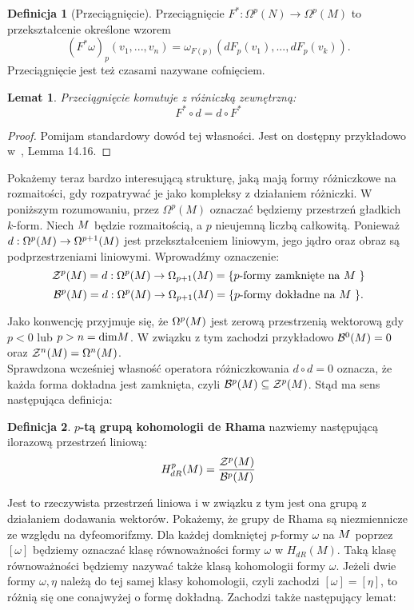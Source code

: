 \documentclass[licencjacka]{pracamgr}
\theoremstyle{definition}
\newtheorem{definition}{Definicja}[section]
\theoremstyle{definition}
\theoremstyle{plain}
\newtheorem{lemma}{Lemat}[section]
\theoremstyle{plain}
\theoremstyle{plain}
\theoremstyle{plain}
\def\M{\ensuremath M}
\begin{document}
\begin{definition}[Przeciągnięcie]
Przeciągnięcie $F^\ast: \Omega^p(N) \rightarrow \Omega^p(M)$ to przekształcenie
określone wzorem
\[
    (F^\ast \omega)_p(v_1, ..., v_n) =
        \omega_{F(p)}(dF_p(v_1), ..., dF_p(v_k)).
\] Przeciągnięcie jest też czasami nazywane cofnięciem.
\end{definition}
\begin{lemma}
Przeciągnięcie komutuje z różniczką zewnętrzną:
\[
F^\ast \circ d = d \circ F^\ast
\]
\end{lemma}
\begin{proof}
Pomijam standardowy dowód tej własności. Jest on dostępny przykładowo
w~\cite{lee}, Lemma 14.16.
\end{proof}


Pokażemy teraz bardzo interesującą strukturę, jaką mają formy różniczkowe na
rozmaitości, gdy rozpatrywać je jako kompleksy z działaniem różniczki.  W
poniższym rozumowaniu, przez $\Omega^p (M)$ oznaczać będziemy przestrzeń
gładkich $k$-form.  Niech $\M$ będzie rozmaitością, a $p$ nieujemną
liczbą całkowitą.  Ponieważ $d: \Omega^p (\M ) \rightarrow \Omega^{p+1}(\M) $
jest przekształceniem liniowym, jego jądro oraz obraz są podprzestrzeniami
liniowymi. Wprowadźmy oznaczenie:
\[
\mathcal{Z}^p ( \M ) =
d: \Omega^{p} (\M ) \rightarrow \Omega_{p+1}(\M) =
\{\text{$p$-formy zamknięte na $\M$ } \}
\]
\[
\mathcal{B}^p ( \M ) =
d: \Omega^{p} (\M ) \rightarrow \Omega_{p+1}(\M) =
\{\text{$p$-formy dokładne na $\M$ } \}.
\]

Jako konwencję przyjmuje się, że $\Omega^{p} ( \M ) $ jest zerową
przestrzenią wektorową gdy $p < 0$ lub $p > n = \text{dim} \M $. W
związku z tym zachodzi przykładowo $\mathcal{B}^0(\M)=0$ oraz
$\mathcal{Z}^n(\M)= \Omega^n(\M)$. \\

Sprawdzona wcześniej własność operatora różniczkowania $d \circ d = 0$ oznacza,
że każda forma dokładna jest zamknięta, czyli
$ \mathcal{B}^p ( \M) \subseteq \mathcal{Z}^p ( \M) $.
Stąd ma sens następująca definicja:

\begin{definition}
  \textbf{$p$-tą grupą kohomologii de Rhama} nazwiemy następującą
  ilorazową przestrzeń liniową:
  \[
  H^{p}_{dR} ( \M ) = \frac {\mathcal{Z}^p ( \M )} {\mathcal{B}^p ( \M )}
  \]
\end{definition}
Jest to rzeczywista przestrzeń liniowa i w związku z tym jest ona
grupą z działaniem dodawania wektorów. Pokażemy, że grupy de Rhama są
niezmiennicze ze względu na dyfeomorifzmy. Dla każdej domkniętej $p$-formy
$\omega$ na $\M$ poprzez $[\omega]$ będziemy oznaczać klasę równoważności
formy $\omega$ w $H_{dR} (M)$. Taką klasę równoważności będziemy nazywać także klasą
kohomologii formy $\omega$. Jeżeli dwie formy $\omega, \eta$ należą do tej samej klasy
kohomologii, czyli zachodzi $[\omega] = [\eta]$, to różnią się one conajwyżej o formę
dokładną. Zachodzi także następujący lemat:
\end{document}
